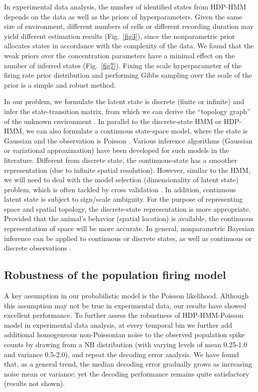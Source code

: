 In experimental data analysis, the number of identified states from
HDP-HMM depends on the data as well as the priors of
hyperparameters. Given the same size of environment, different numbers
of cells or different recording duration may yield different
estimation results (Fig.~\ref{fig3}), since the nonparametric prior
allocates states in accordance with the complexity of the data. We
found that the weak priors over the concentration parameters have a
minimal effect on the number of inferred states
(Fig.~\ref{fig7}). Fixing the scale hyperparameter of the firing rate
prior distribution and performing Gibbs sampling over the scale of the
prior is a simple and robust method.


 
In our problem, we formulate the latent state is discrete (finite or
infinite) and infer the state-transition matrix, from which we can
derive the ``topology graph'' of the unknown environment
\citep{Chen12a,Chen14}. In parallel to the discrete-state HMM or
HDP-HMM, we can also formulate a continuous state-space model, where
the state is Gaussian and the observation is Poisson
\citep{Brown98,Smith03,Yu09,Buesing12}. Various inference algorithms
(Gaussian or variational approximation) have been developed for such
models in the literature. Different from discrete state, the
continuous-state has a smoother representation (due to infinite
spatial resolution). However, similar to the HMM, we will need to deal
with the model selection (dimensionality of latent state) problem,
which is often tackled by cross validation \citep{Yu09}. In addition,
continuous latent state is subject to sign/scale ambiguity. For the
purpose of representing space and spatial topology, the discrete-state
representation is more appropriate. Provided that the animal's
behavior (spatial location) is available, the continuous
representation of space will be more accurate. In general,
nonparametric Bayesian inference can be applied to continuous or
discrete states, as well as continuous or discrete observations
\citep{Teh06,van08,Fox08,Fox10,Chen15Book}.



\subsection{Robustness of the population firing model}

A key assumption in our probabilistic model is the Poisson
likelihood. Although this assumption may not be true in experimental
data, our results have showed excellent performance.  To further
assess the robustness of HDP-HMM-Poisson model in experimental data
analysis, at every temporal bin we further add additional homogeneous
non-Poissonian noise to the observed population spike counts by
drawing from a NB distribution (with varying levels of mean 0.25-1.0
and variance 0.5-2.0), and repeat the decoding error analysis. We have
found that, as a general trend, the median decoding error gradually
grows as increasing noise mean or variance; yet the decoding
performance remains quite satisfactory (results not shown).



